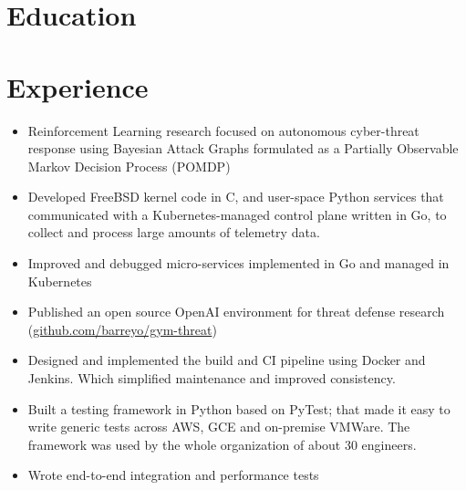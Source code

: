\documentclass{cv_doc}
\begin{document}
\vspace{0.5cm}


\section*{Education}


\vspace{0.3cm}

\section*{Experience}


\begin{itemize}[label={\tiny\raisebox{1ex}{\textbullet}}]
  \item {Reinforcement Learning research focused on autonomous cyber-threat response using Bayesian Attack Graphs formulated as a Partially Observable
  Markov Decision Process (POMDP)}
  \item {Developed FreeBSD kernel code in C, and user-space Python services that
  communicated with a Kubernetes-managed control plane written in Go, to
  collect and process large amounts of telemetry data.}
  \item {Improved and debugged micro-services implemented in Go and managed in Kubernetes}
  \item {Published an open source OpenAI environment for
  threat defense research (\href{https://github.com/barreyo/gym-threat}{github.com/barreyo/gym-threat}})
\end{itemize}


\begin{itemize}[label={\tiny\raisebox{1ex}{\textbullet}}]
  \item {Designed and implemented the build and CI pipeline using Docker and Jenkins. Which simplified maintenance and improved consistency.}
  \item {Built a testing framework in Python based on PyTest; that made it easy
  to write generic tests across AWS, GCE and on-premise VMWare. The framework
  was used by the whole organization of about 30 engineers.}
  \item {Wrote end-to-end integration and performance tests}
\end{itemize}
\end{document}
